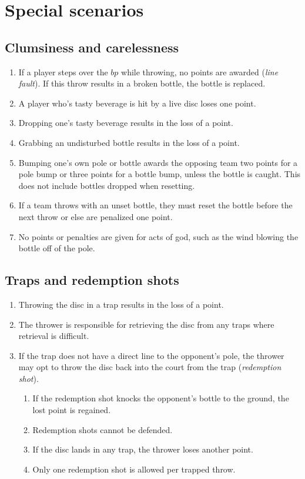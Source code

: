 \documentclass[11pt,letterpaper,twocolumn,english,DIV=calc]{scrartcl}
\begin{document}
\section{\label{sec:special-scenarios}Special scenarios}

\subsection{\label{subsec:clumsiness-and-carelessness}Clumsiness and carelessness}
\begin{enumerate}[leftmargin=2.8em, label=\thesubsection.\arabic*]
	\item If a player steps over the $bp$ while throwing, no points are awarded (\emph{line fault}). 
	If this throw results in a broken bottle, the bottle is replaced.
	\item A player who's tasty beverage is hit by a live disc loses one point.
	\item Dropping one's tasty beverage results in the loss of a point.
	\item Grabbing an undisturbed bottle results in the loss of a point.
	\item Bumping one's own pole or bottle awards the opposing team two points for a pole bump or three points for a bottle bump, unless the bottle is caught. 
	This does not include bottles dropped when resetting.
	\item If a team throws with an unset bottle, they must reset the bottle before the next throw or else are penalized one point.
	\item No points or penalties are given for acts of god, such as the wind blowing the bottle off of the pole.
\end{enumerate}

\subsection{\label{subsec:traps}Traps and redemption shots}
\begin{enumerate}[leftmargin=2.8em, label=\thesubsection.\arabic*]
	\item Throwing the disc in a trap results in the loss of a point.
	\item The thrower is responsible for retrieving the disc from any traps where retrieval is difficult.
	\item If the trap does not have a direct line to the opponent's pole, the thrower may opt to throw the disc back into the court from the trap (\emph{redemption shot}).

	\begin{enumerate}
		\item If the redemption shot knocks the opponent's bottle to the ground, the lost point is regained.
		\item Redemption shots cannot be defended.
		\item If the disc lands in any trap, the thrower loses another point.
		\item Only one redemption shot is allowed per trapped throw.
	\end{enumerate}
\end{enumerate}
\end{document}
